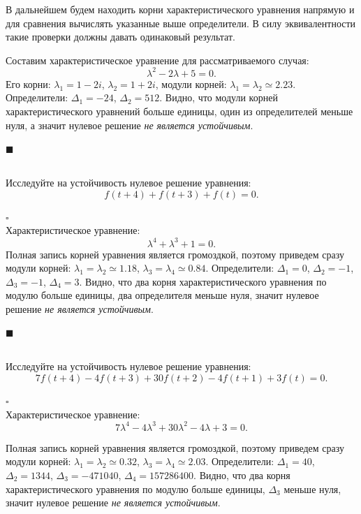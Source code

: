 \documentclass[a4paper]{article}
\newcommand{\solutionstart}{{\noindent $\square$ \\}}
\newcommand{\solutionend}{{\noindent $\blacksquare$ \\}}
\begin{document}
В дальнейшем будем находить корни характеристического уравнения напрямую и для сравнения вычислять указанные выше определители. В силу эквивалентности такие проверки должны давать одинаковый результат.

Составим характеристическое уравнение для рассматриваемого случая:
\[
\lambda^2 - 2 \lambda + 5 = 0.
\]
Его корни: $\lambda_1 = 1 - 2i$, $\lambda_2 = 1 + 2i$, модули корней: $\lambda_1 = \lambda_2 \simeq 2.23$. Определители: $\Delta_1 = -24$, $\Delta_2 = 512$. Видно, что модули корней характеристического уравнений больше единицы, один из определителей меньше нуля, а значит нулевое решение \textit{не является устойчивым}.

\solutionend

\subsection{}
Исследуйте на устойчивость нулевое решение уравнения:
\[
	f(t + 4) + f (t + 3) + f(t) = 0.
\]

\solutionstart
Характеристическое уравнение: 
\[
\lambda^4 + \lambda^3 + 1 = 0.
\]
Полная запись корней уравнения является громоздкой, поэтому приведем сразу модули корней: $\lambda_1 = \lambda_2 \simeq 1.18$, $\lambda_3 = \lambda_4 \simeq 0.84$. Определители: $\Delta_1 = 0$, $\Delta_2 = -1$, $\Delta_3 = -1$, $\Delta_4 = 3$. Видно, что два корня характеристического уравнения по модулю больше единицы, два определителя меньше нуля, значит нулевое решение \textit{не является устойчивым}.

\solutionend


\subsection{}
Исследуйте на устойчивость нулевое решение уравнения:
\[
	7 f(t + 4) - 4 f (t + 3) + 30 f(t + 2) - 4 f(t + 1) + 3 f(t) = 0.
\]

\solutionstart
Характеристическое уравнение: 
\[
7 \lambda^4 - 4 \lambda^3 + 30 \lambda^2 - 4 \lambda + 3 = 0.
\]

Полная запись корней уравнения является громоздкой, поэтому приведем сразу модули корней: $\lambda_1 = \lambda_2 \simeq 0.32$, $\lambda_3 = \lambda_4 \simeq 2.03$. Определители: $\Delta_1 = 40$, $\Delta_2 = 1344$, $\Delta_3 = -471040$, $\Delta_4 = 157286400$. Видно, что два корня характеристического уравнения по модулю больше единицы, $\Delta_3$ меньше нуля, значит нулевое решение \textit{не является устойчивым}.
\end{document}
